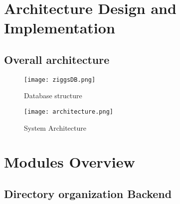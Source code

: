 \documentclass[conference]{IEEEtran}
\begin{document}
\section{Architecture Design and Implementation}

\subsection{Overall architecture}
\begin{figure}[H]
    \centering
    \texttt{[image: ziggsDB.png]}
    \caption{Database structure}
    \label{fig:database}
\end{figure}


\begin{figure}[H]
    \centering
    \texttt{[image: architecture.png]}
    \caption{System Architecture}
    \label{fig:system_architecture}
\end{figure}

\section{Modules Overview}

\subsection{Directory organization Backend}
\end{document}
